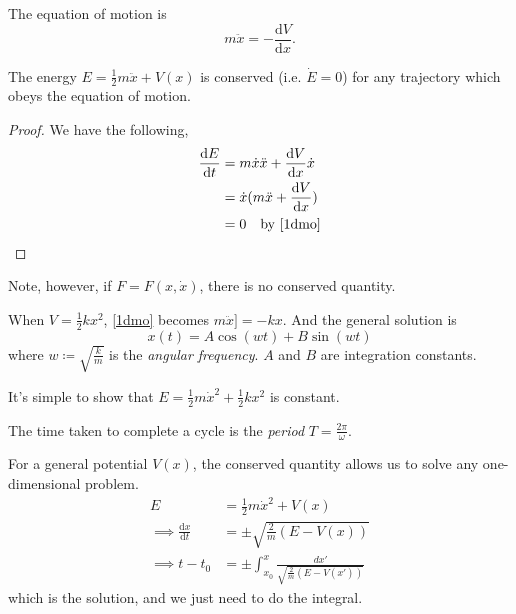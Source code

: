 The equation of motion is
\begin{equation}
    m\ddot{x} = -\frac{\mathrm{d}V}{\mathrm{d}x}.
    \label{1dmo}
\end{equation}

\begin{proposition}{}{}
    The energy \(E = \frac{1}{2}m\ddot{x}+V(x)\) is conserved (i.e. \(\dot{E} = 0\)) for any trajectory which obeys the equation of motion.
\end{proposition}
\begin{proof}
    We have the following,
    \begin{align*}
        \frac{\mathrm{d}E}{\mathrm{d}t} &= m\dot{x}\ddot{x} + \frac{\mathrm{d}V}{\mathrm{d}x} \dot{x}\\
        &=\dot{x}(m\ddot{x} + \frac{\mathrm{d}V}{\mathrm{d}x})\\
        &=0\quad \text{by \cref{1dmo}}
    \end{align*}
\end{proof}
Note, however, if \(F = F(x, \dot{x})\), there is no conserved quantity.

\begin{example}
    When \(V = \frac{1}{2}kx^2\), \cref{1dmo} becomes \(m\ddot{x}] = -kx\). And the general solution is
    \[
        x(t) = A\cos(wt) + B\sin(wt)
    \]
    where \(w\coloneqq \sqrt{\frac{k}{m}}\) is the \textit{angular frequency}. \(A\) and \(B\) are integration constants.

    It's simple to show that \(E = \frac{1}{2}m\dot{x}^2 +\frac{1}{2}kx^2\) is constant.

    The time taken to complete a cycle is the \textit{period} \(T = \frac{2\pi}{\omega}\).
\end{example}

For a general potential \(V(x)\), the conserved quantity allows us to solve any one-dimensional problem.
\begin{align*}
    E &= \frac{1}{2} m\dot{x}^2 + V(x)\\
    \implies \frac{\mathrm{d}x}{\mathrm{d}t} &= \pm \sqrt{\frac{2}{m}(E - V(x))}\\
    \implies t - t_0 &= \pm \int_{x_0}^x \frac{dx'}{\sqrt{\frac{2}{m}(E - V(x'))} }
\end{align*}
which is the solution, and we just need to do the integral.

